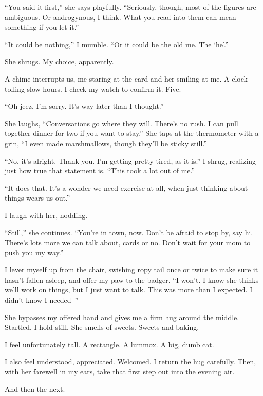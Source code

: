 ``You said it first,'' she says playfully. ``Seriously, though, most of the figures are ambiguous. Or androgynous, I think. What you read into them can mean something if you let it.''

``It could be nothing,'' I mumble. ``Or it could be the old me. The `he'.''

She shrugs. My choice, apparently.

A chime interrupts us, me staring at the card and her smiling at me. A clock tolling slow hours. I check my watch to confirm it. Five.

``Oh jeez, I'm sorry. It's way later than I thought.''

She laughs, ``Conversations go where they will. There's no rush. I can pull together dinner for two if you want to stay.'' She taps at the thermometer with a grin, ``I even made marshmallows, though they'll be sticky still.''

``No, it's alright. Thank you. I'm getting pretty tired, as it is.'' I shrug, realizing just how true that statement is. ``This took a lot out of me.''

``It does that. It's a wonder we need exercise at all, when just thinking about things wears us out.''

I laugh with her, nodding.

``Still,'' she continues. ``You're in town, now. Don't be afraid to stop by, say hi. There's lots more we can talk about, cards or no. Don't wait for your mom to push you my way.''

I lever myself up from the chair, swishing ropy tail once or twice to make sure it hasn't fallen asleep, and offer my paw to the badger. ``I won't. I know she thinks we'll work on things, but I just want to talk. This was more than I expected. I didn't know I needed--''

She bypasses my offered hand and gives me a firm hug around the middle. Startled, I hold still. She smells of sweets. Sweets and baking.

I feel unfortunately tall. A rectangle. A lummox. A big, dumb cat.

I also feel understood, appreciated. Welcomed. I return the hug carefully. Then, with her farewell in my ears, take that first step out into the evening air.

And then the next.
